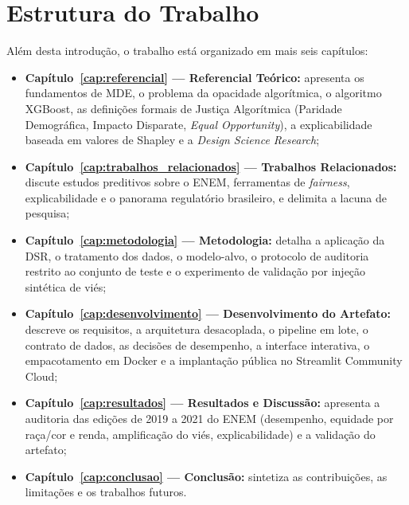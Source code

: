 \section{Estrutura do Trabalho}
Além desta introdução, o trabalho está organizado em mais seis capítulos:
\begin{itemize}
    \item \textbf{Capítulo~\ref{cap:referencial} --- Referencial Teórico:} apresenta os fundamentos de MDE, o problema da opacidade algorítmica, o algoritmo XGBoost, as definições formais de Justiça Algorítmica (Paridade Demográfica, Impacto Disparate, \textit{Equal Opportunity}), a explicabilidade baseada em valores de Shapley e a \textit{Design Science Research};
    \item \textbf{Capítulo~\ref{cap:trabalhos_relacionados} --- Trabalhos Relacionados:} discute estudos preditivos sobre o ENEM, ferramentas de \textit{fairness}, explicabilidade e o panorama regulatório brasileiro, e delimita a lacuna de pesquisa;
    \item \textbf{Capítulo~\ref{cap:metodologia} --- Metodologia:} detalha a aplicação da DSR, o tratamento dos dados, o modelo-alvo, o protocolo de auditoria restrito ao conjunto de teste e o experimento de validação por injeção sintética de viés;
    \item \textbf{Capítulo~\ref{cap:desenvolvimento} --- Desenvolvimento do Artefato:} descreve os requisitos, a arquitetura desacoplada, o pipeline em lote, o contrato de dados, as decisões de desempenho, a interface interativa, o empacotamento em Docker e a implantação pública no Streamlit Community Cloud;
    \item \textbf{Capítulo~\ref{cap:resultados} --- Resultados e Discussão:} apresenta a auditoria das edições de 2019 a 2021 do ENEM (desempenho, equidade por raça/cor e renda, amplificação do viés, explicabilidade) e a validação do artefato;
    \item \textbf{Capítulo~\ref{cap:conclusao} --- Conclusão:} sintetiza as contribuições, as limitações e os trabalhos futuros.
\end{itemize}
